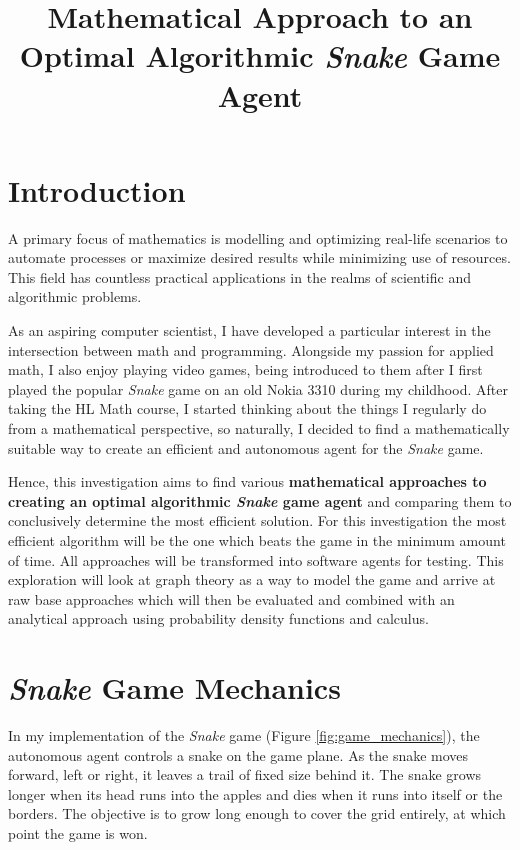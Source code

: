 \documentclass[12pt]{article}
\title{Mathematical Approach to an Optimal Algorithmic \textit{Snake} Game Agent}
\author{}
\date{}
\begin{document}
\begin{singlespace}
\maketitle
\end{singlespace}

\section{Introduction}

A primary focus of mathematics is modelling and optimizing real-life scenarios to automate processes or maximize desired results while minimizing use of resources. This field has countless practical applications in the realms of scientific and algorithmic problems.

As an aspiring computer scientist, I have developed a particular interest in the intersection between math and programming. Alongside my passion for applied math, I also enjoy playing video games, being introduced to them after I first played the popular \textit{Snake} game on an old Nokia 3310 during my childhood. After taking the HL Math course, I started thinking about the things I regularly do from a mathematical perspective, so naturally, I decided to find a mathematically suitable way to create an efficient and autonomous agent for the \textit{Snake} game.

Hence, this investigation aims to find various \textbf{mathematical approaches to creating an optimal algorithmic \textit{Snake} game agent} and comparing them to conclusively determine the most efficient solution. For this investigation the most efficient algorithm will be the one which beats the game in the minimum amount of time. All approaches will be transformed into software agents for testing. This exploration will look at graph theory as a way to model the game and arrive at raw base approaches which will then be evaluated and combined with an analytical approach using probability density functions and calculus. 

\section{\textit{Snake} Game Mechanics}

In my implementation of the \textit{Snake} game (Figure \ref{fig:game_mechanics}), the autonomous agent controls a snake on the game plane. As the snake moves forward, left or right, it leaves a trail of fixed size behind it. The snake grows longer when its head runs into the apples and dies when it runs into itself or the borders. The objective is to grow long enough to cover the grid entirely, at which point the game is won.
\end{document}
